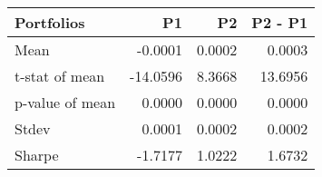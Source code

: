 \begin{tabular}{lrrr}
\toprule
Portfolios & P1 & P2 & P2 - P1 \\
\midrule
Mean & -0.0001 & 0.0002 & 0.0003 \\
t-stat of mean & -14.0596 & 8.3668 & 13.6956 \\
p-value of mean & 0.0000 & 0.0000 & 0.0000 \\
Stdev & 0.0001 & 0.0002 & 0.0002 \\
Sharpe & -1.7177 & 1.0222 & 1.6732 \\
\bottomrule
\end{tabular}
